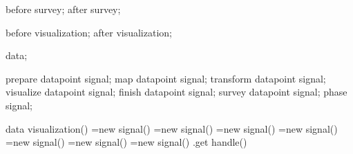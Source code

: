 {


  \attribute before survey;
  \attribute after survey;


  \attribute before visualization;
  \attribute after visualization;

  
  \attribute data;

  
  \attribute prepare datapoint signal;
  \attribute map datapoint signal;
  \attribute transform datapoint signal;
  \attribute visualize datapoint signal;
  \attribute finish datapoint signal;
  \attribute survey datapoint signal;
  \attribute phase signal;

  
  \method data visualization() {
    =new signal()%
    =new signal()%
    =new signal()%
    =new signal()%
    =new signal()%
    =new signal()%
    =new signal()%
    \pgfoothis.get handle(\pgf@dv@me)
    \pgf@dv@me
  }

  \def\pgfdvbeginsurvey{1}
  \def\pgfdvendsurvey{2}
  \def\pgfdvbeginvisualization{3}
  \def\pgfdvendvisualization{4}


}
